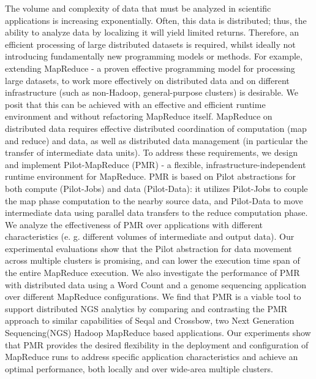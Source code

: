 \documentclass[12pt]{report}
\begin{document}
%
The volume and complexity of data that must be analyzed in scientific applications is increasing exponentially. Often, this data is distributed; thus, the ability to analyze data by localizing it will yield limited returns. Therefore, an efficient processing of large distributed datasets is required, whilst ideally not introducing fundamentally new programming models or methods. For example, extending MapReduce - a proven effective programming model for processing large datasets, to work more effectively on distributed data and on different infrastructure (such as non-Hadoop, general-purpose clusters) is desirable. We posit that this can be achieved with an effective and efficient runtime environment and without refactoring MapReduce itself. MapReduce on distributed data requires effective distributed coordination of computation (map and reduce) and data, as well as distributed data management (in particular the transfer of intermediate data units). To address these requirements, we design and implement Pilot-MapReduce (PMR) - a flexible, infrastructure-independent runtime environment for MapReduce. PMR is based on Pilot abstractions for both compute (Pilot-Jobs) and data (Pilot-Data): it utilizes Pilot-Jobs to couple the map phase computation to the nearby source data, and Pilot-Data to move intermediate data using parallel data transfers to the reduce computation phase. We analyze the effectiveness of PMR over applications with different characteristics (e. g. different volumes of intermediate and output data). Our experimental evaluations show that the Pilot abstraction for data movement across multiple clusters is promising, and can lower the execution time span of the entire MapReduce execution. We also investigate the performance of PMR with distributed data using a Word Count and a genome sequencing application over different MapReduce configurations.  We find that PMR is a viable tool to support distributed NGS analytics by comparing and contrasting the PMR approach to similar capabilities of Seqal and Crossbow, two Next Generation Sequencing(NGS) Hadoop MapReduce based applications. Our experiments show that PMR provides the desired flexibility in the deployment and configuration of MapReduce runs to address specific application characteristics and achieve an optimal performance, both locally and over wide-area multiple clusters.
\newpage


\end{document}
